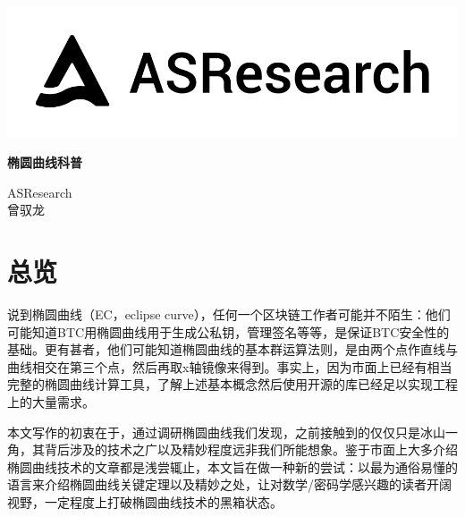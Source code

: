 \documentclass[12pt]{article}
\begin{document}
\pagestyle{empty}
\renewcommand{\contentsname}{目录}
\renewcommand{\abstractname}{摘要}
\renewcommand{\refname}{参考文献}
\renewcommand{\figurename}{图}
\renewcommand{\tablename}{表}
\renewcommand{\baselinestretch}{1.5}
\renewcommand{\appendixname}{附录}
\renewcommand{\proofname}{证明}

\pagecolor{\pcolor}



\begin{titlepage}
  \begin{center}
    \vspace*{5.5cm}
    \includegraphics[scale=0.5]{../common/logo.png}
    \vspace{0.5cm}


   \textbf{\huge{椭圆曲线科普}}

    \vspace{0.5cm}
    ASResearch\\
    曾驭龙
    \textbf{}
  \end{center}

\end{titlepage}
\setcounter{page}{0}
\tableofcontents
\newpage
\setcounter{page}{1}
\pagestyle{fancy}
\vspace*{0.01cm}

\section{总览}
说到椭圆曲线（EC，eclipse curve），任何一个区块链工作者可能并不陌生：他们可能知道BTC用椭圆曲线用于生成公私钥，管理签名等等，是保证BTC安全性的基础。更有甚者，他们可能知道椭圆曲线的基本群运算法则，是由两个点作直线与曲线相交在第三个点，然后再取x轴镜像来得到。事实上，因为市面上已经有相当完整的椭圆曲线计算工具，了解上述基本概念然后使用开源的库已经足以实现工程上的大量需求。

本文写作的初衷在于，通过调研椭圆曲线我们发现，之前接触到的仅仅只是冰山一角，其背后涉及的技术之广以及精妙程度远非我们所能想象。鉴于市面上大多介绍椭圆曲线技术的文章都是浅尝辄止，本文旨在做一种新的尝试：以最为通俗易懂的语言来介绍椭圆曲线关键定理以及精妙之处，让对数学/密码学感兴趣的读者开阔视野，一定程度上打破椭圆曲线技术的黑箱状态。
\end{document}
